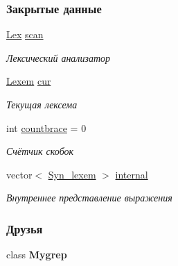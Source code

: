 \subsubsection*{Закрытые данные}
\begin{DoxyCompactItemize}
\item 
\hypertarget{class_syntax_afa60cc2342d74dbdbb8679ee1677b8e1}{}\hyperlink{class_lex}{Lex} \hyperlink{class_syntax_afa60cc2342d74dbdbb8679ee1677b8e1}{scan}\label{class_syntax_afa60cc2342d74dbdbb8679ee1677b8e1}

\begin{DoxyCompactList}\small\item\em Лексический анализатор \end{DoxyCompactList}\item 
\hypertarget{class_syntax_a18d0feb830951877fef2692ea77f931b}{}\hyperlink{class_lexem}{Lexem} \hyperlink{class_syntax_a18d0feb830951877fef2692ea77f931b}{cur}\label{class_syntax_a18d0feb830951877fef2692ea77f931b}

\begin{DoxyCompactList}\small\item\em Текущая лексема \end{DoxyCompactList}\item 
\hypertarget{class_syntax_a2337e4b3bc2ff71bddf65ca7461c012c}{}int \hyperlink{class_syntax_a2337e4b3bc2ff71bddf65ca7461c012c}{countbrace} = 0\label{class_syntax_a2337e4b3bc2ff71bddf65ca7461c012c}

\begin{DoxyCompactList}\small\item\em Счётчик скобок \end{DoxyCompactList}\item 
\hypertarget{class_syntax_ae2ce745407fa89c47376e82bc208162e}{}vector$<$ \hyperlink{class_syn__lexem}{Syn\+\_\+lexem} $>$ \hyperlink{class_syntax_ae2ce745407fa89c47376e82bc208162e}{internal}\label{class_syntax_ae2ce745407fa89c47376e82bc208162e}

\begin{DoxyCompactList}\small\item\em Внутреннее представление выражения \end{DoxyCompactList}\end{DoxyCompactItemize}
\subsubsection*{Друзья}
\begin{DoxyCompactItemize}
\item 
\hypertarget{class_syntax_a90fdb1ff12233c504810e346b5f6e49f}{}class {\bfseries Mygrep}\label{class_syntax_a90fdb1ff12233c504810e346b5f6e49f}

\end{DoxyCompactItemize}


